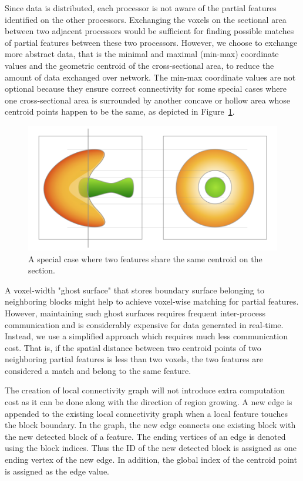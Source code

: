 \documentclass[10pt, conference, compsocconf]{IEEEtran}
\begin{document}
Since data is distributed, each processor is not aware of the partial features identified on the other processors. Exchanging the voxels on the sectional area between two adjacent processors would be sufficient for finding possible matches of partial features between these two processors. However, we choose to exchange more abstract data, that is the minimal and maximal (min-max) coordinate values and the geometric centroid of the cross-sectional area, to reduce the amount of data exchanged over network. The min-max coordinate values are not optional because they ensure correct connectivity for some special cases where one cross-sectional area is surrounded by another concave or hollow area whose centroid points happen to be the same, as depicted in Figure~\ref{fig:special}.

\begin{figure}[ht]
\centering
\includegraphics[width=0.9\linewidth]{figure1@2x.png}
\caption{A special case where two features share the same centroid on the section.}
\label{fig:special}
\end{figure}

A voxel-width "ghost surface" that stores boundary surface belonging to neighboring blocks might help to achieve voxel-wise matching for partial features. However, maintaining such ghost surfaces requires frequent inter-process communication and is considerably expensive for data generated in real-time. Instead, we use a simplified approach which requires much less communication cost. That is, if the spatial distance between two centroid points of two neighboring partial features is less than two voxels, the two features are considered a match and belong to the same feature.

The creation of local connectivity graph will not introduce extra computation cost as it can be done along with the direction of region growing. A new edge is appended to the existing local connectivity graph when a local feature touches the block boundary. In the graph, the new edge connects one existing block with the new detected block of a feature. The ending vertices of an edge is denoted using the block indices. Thus the ID of the new detected block is assigned as one ending vertex of the new edge. In addition, the global index of the centroid point is assigned as the edge value. 
\end{document}
